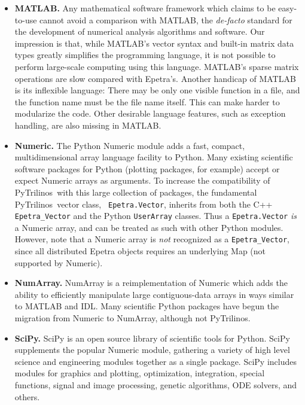 \documentclass[10pt,relax]{SANDreport}
\newcommand{\PyTrilinos}{{PyTrilinos}}
\begin{document}
\begin{itemize}

\item {\bf MATLAB.} Any mathematical software framework which
  claims to be easy-to-use cannot avoid a comparison with MATLAB, the
  {\sl de-facto} standard for the development of numerical analysis
  algorithms and software. Our impression is that, while MATLAB's
  vector syntax and built-in matrix data types greatly simplifies the
  programming language, it is not possible to perform large-scale
  computing using this language. MATLAB's sparse matrix operations are
  slow compared with Epetra's. Another handicap of MATLAB is its
  inflexible language: There may be only one visible function in a
  file, and the function name must be the file name itself. This can
  make harder to modularize the code.  Other desirable language
  features, such as exception handling, are also missing in MATLAB.

\item {\bf Numeric.} The Python Numeric module adds a fast, compact,
  multidimensional array language facility to Python.  Many existing
  scientific software packages for Python (plotting packages, for
  example) accept or expect Numeric arrays as arguments.  To increase
  the compatibility of \PyTrilinos\ with this large collection of
  packages, the fundamental \PyTrilinos\ vector class, {\tt
    Epetra.Vector}, inherits from both the C++ {\tt Epetra\_Vector}
  and the Python {\tt UserArray} classes.  Thus a {\tt Epetra.Vector}
  {\sl is} a Numeric array, and can be treated as such with other
  Python modules.  However, note that a Numeric array is {\sl not}
  recognized as a {\tt Epetra\_Vector}, since all distributed Epetra
  objects requires an underlying Map (not supported by Numeric).

\item {\bf NumArray.}  NumArray is a reimplementation of Numeric which
  adds the ability to efficiently manipulate large contiguous-data
  arrays in ways similar to MATLAB and IDL.  Many scientific Python
  packages have begun the migration from Numeric to NumArray, although
  not \PyTrilinos.

\item {\bf SciPy.} SciPy is an open source library of scientific tools
  for Python. SciPy supplements the popular Numeric module, gathering
  a variety of high level science and engineering modules together as
  a single package. SciPy includes modules for graphics and plotting,
  optimization, integration, special functions, signal and image
  processing, genetic algorithms, ODE solvers, and others.


\end{itemize}
\end{document}

